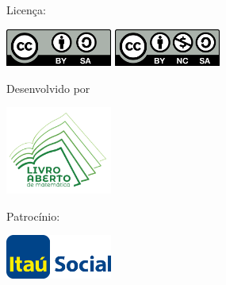 {	\vfill

	\begin{minipage}{\la@student@textwidth}
		\begin{minipage}[l]{5cm}
			\centering

			{\large Licença:}

			\vspace{1em}

			\ifdefined%
				\la@ccbysa
				\includegraphics[width=3.5cm]{resources/figures/cc-by-sa1.pdf}
			\else
				\includegraphics[width=3.5cm]{resources/figures/cc-by-nc-sa.pdf}
			\fi

		\end{minipage}
		\hfill
		\begin{minipage}[c]{5cm}
			\centering
			{\large Desenvolvido por}

			\vspace{1em}
			\includegraphics[width=3.5cm]{resources/figures/logo-associacao.pdf}
		\end{minipage}
		\hfill
		\begin{minipage}[r]{5cm}
			\centering

			{\large Patrocínio:}

			\vspace{1em}
			\includegraphics[width=3.5cm]{resources/figures/itau.pdf}
		\end{minipage}
	\end{minipage}

	\undef\la@author%
	\undef\la@revisao%
	\revisaofalse%
	\authorsfalse%

	\undef\la@versao
	\undef\la@autorcapa
	\undef\la@graficos
	\undef\la@versaodigital
	\undef\la@ccbysa
  \clearpage
}
